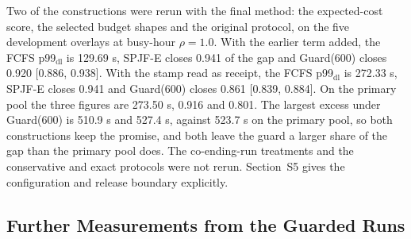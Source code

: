 \documentclass[mathematics,supfile,submit,moreauthors]{Definitions/mdpi}
\newcommand{\devnum}[1]{#1}
\begin{document}
Two of the constructions were rerun with the final method: the expected-cost score, the
selected budget shapes and the original protocol, on the five development overlays at
busy-hour $\rho = \devnum{1.0}$. With the earlier term added, the FCFS p99$_{\mathrm{dl}}$
is \devnum{129.69} s, SPJF-E closes \devnum{0.941} of the gap and Guard(\devnum{600})
closes \devnum{0.920} [\devnum{0.886}, \devnum{0.938}]. With the stamp read as receipt,
the FCFS p99$_{\mathrm{dl}}$ is \devnum{272.33} s, SPJF-E closes \devnum{0.941} and
Guard(\devnum{600}) closes \devnum{0.861} [\devnum{0.839}, \devnum{0.884}]. On the primary
pool the three figures are \devnum{273.50} s, \devnum{0.916} and \devnum{0.801}. The
largest excess under Guard(\devnum{600}) is \devnum{510.9} s and \devnum{527.4} s, against
\devnum{523.7} s on the primary pool, so both constructions keep the promise, and both
leave the guard a larger share of the gap than the primary pool does. The co-ending-run
treatments and the conservative and exact protocols were not rerun. Section~S5 gives the
configuration and release boundary explicitly.


\subsection{Further Measurements from the Guarded Runs}
\label{sec:supp_guardmeas}
\end{document}
